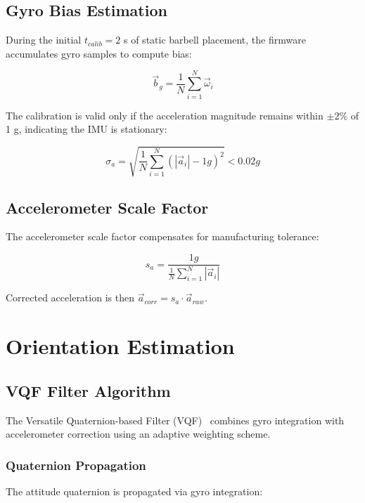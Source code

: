 \subsection{Gyro Bias Estimation}

During the initial $t_{calib} = 2$ s of static barbell placement, the firmware accumulates gyro samples to compute bias:

\begin{equation}
    \vec{b}_g = \frac{1}{N} \sum_{i=1}^{N} \vec{\omega}_i
\end{equation}

The calibration is valid only if the acceleration magnitude remains within $\pm 2\%$ of 1 g, indicating the IMU is stationary:

\begin{equation}
    \sigma_a = \sqrt{\frac{1}{N}\sum_{i=1}^{N} (|\vec{a}_i| - 1g)^2} < 0.02g
\end{equation}

\subsection{Accelerometer Scale Factor}

The accelerometer scale factor compensates for manufacturing tolerance:

\begin{equation}
    s_a = \frac{1g}{\frac{1}{N}\sum_{i=1}^{N} |\vec{a}_i|}
\end{equation}

Corrected acceleration is then $\vec{a}_{corr} = s_a \cdot \vec{a}_{raw}$.

\section{Orientation Estimation}

\subsection{VQF Filter Algorithm}

The Versatile Quaternion-based Filter (VQF)~\cite{laidig2021} combines gyro integration with accelerometer correction using an adaptive weighting scheme.

\subsubsection{Quaternion Propagation}

The attitude quaternion is propagated via gyro integration:

